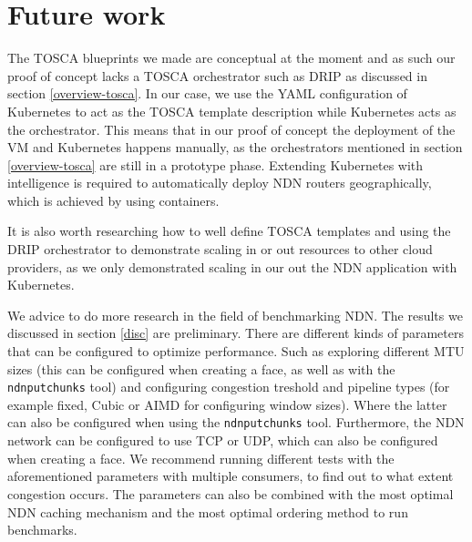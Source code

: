 \section{Future work}\label{fut}


The TOSCA blueprints we made are conceptual at the moment and as such our proof of concept lacks a TOSCA orchestrator such as DRIP as discussed in section \ref{overview-tosca}. In our case, we use the YAML configuration of Kubernetes to act as the TOSCA template description while Kubernetes acts as the orchestrator. This means that in our proof of concept the deployment of the VM and Kubernetes happens manually, as the orchestrators mentioned in section \ref{overview-tosca} are still in a prototype phase. 
Extending Kubernetes with intelligence is required to automatically deploy NDN routers geographically, which is achieved by using containers.

It is also worth researching how to well define TOSCA templates and using the DRIP orchestrator to demonstrate scaling in or out resources to other cloud providers, as we only demonstrated scaling in our out the NDN application with Kubernetes. 

We advice to do more research in the field of benchmarking NDN. The results we discussed in section \ref{disc} are preliminary. There are different kinds of parameters that can be configured to optimize performance. Such as exploring different MTU sizes (this can be configured when creating a face, as well as with the \texttt{ndnputchunks} tool) and configuring congestion treshold and pipeline types (for example fixed, Cubic or AIMD for configuring window sizes). Where the latter can also be configured when using the \texttt{ndnputchunks} tool. Furthermore, the NDN network can be configured to use TCP or UDP, which can also be configured when creating a face. We recommend running different tests with the aforementioned parameters with multiple consumers, to find out to what extent congestion occurs.
The parameters can also be combined with the most optimal NDN caching mechanism and the most optimal ordering method \cite{koulouzis2018information} to run benchmarks.

